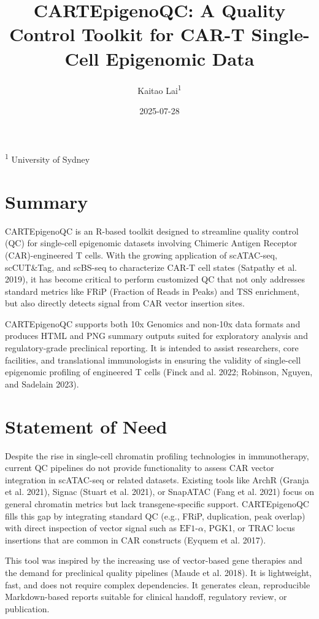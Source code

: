 \documentclass[
]{article}
\title{CARTEpigenoQC: A Quality Control Toolkit for CAR-T Single-Cell
Epigenomic Data}
\author{Kaitao Lai\textsuperscript{1}}
\date{2025-07-28}
\begin{document}
\maketitle

\textsuperscript{1} University of Sydney

\section{Summary}\label{summary}

CARTEpigenoQC is an R-based toolkit designed to streamline quality
control (QC) for single-cell epigenomic datasets involving Chimeric
Antigen Receptor (CAR)-engineered T cells. With the growing application
of scATAC-seq, scCUT\&Tag, and scBS-seq to characterize CAR-T cell
states (Satpathy et al. 2019), it has become critical to perform
customized QC that not only addresses standard metrics like FRiP
(Fraction of Reads in Peaks) and TSS enrichment, but also directly
detects signal from CAR vector insertion sites.

CARTEpigenoQC supports both 10x Genomics and non-10x data formats and
produces HTML and PNG summary outputs suited for exploratory analysis
and regulatory-grade preclinical reporting. It is intended to assist
researchers, core facilities, and translational immunologists in
ensuring the validity of single-cell epigenomic profiling of engineered
T cells (Finck and al. 2022; Robinson, Nguyen, and Sadelain 2023).

\section{Statement of Need}\label{statement-of-need}

Despite the rise in single-cell chromatin profiling technologies in
immunotherapy, current QC pipelines do not provide functionality to
assess CAR vector integration in scATAC-seq or related datasets.
Existing tools like ArchR (Granja et al. 2021), Signac (Stuart et al.
2021), or SnapATAC (Fang et al. 2021) focus on general chromatin metrics
but lack transgene-specific support. CARTEpigenoQC fills this gap by
integrating standard QC (e.g., FRiP, duplication, peak overlap) with
direct inspection of vector signal such as \(\text{EF1-}\alpha\), PGK1,
or TRAC locus insertions that are common in CAR constructs (Eyquem et
al. 2017).

This tool was inspired by the increasing use of vector-based gene
therapies and the demand for preclinical quality pipelines (Maude et al.
2018). It is lightweight, fast, and does not require complex
dependencies. It generates clean, reproducible Markdown-based reports
suitable for clinical handoff, regulatory review, or publication.
\end{document}
